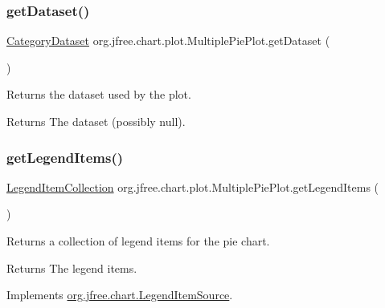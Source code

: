 \subsubsection{\texorpdfstring{get\+Dataset()}{getDataset()}}
{\footnotesize\ttfamily \mbox{\hyperlink{interfaceorg_1_1jfree_1_1data_1_1category_1_1_category_dataset}{Category\+Dataset}} org.\+jfree.\+chart.\+plot.\+Multiple\+Pie\+Plot.\+get\+Dataset (\begin{DoxyParamCaption}{ }\end{DoxyParamCaption})}

Returns the dataset used by the plot.

\begin{DoxyReturn}{Returns}
The dataset (possibly {\ttfamily null}). 
\end{DoxyReturn}
\mbox{\label{classorg_1_1jfree_1_1chart_1_1plot_1_1_multiple_pie_plot_ac0d250e515644283985aec95f5d639f6}} 
\subsubsection{\texorpdfstring{get\+Legend\+Items()}{getLegendItems()}}
{\footnotesize\ttfamily \mbox{\hyperlink{classorg_1_1jfree_1_1chart_1_1_legend_item_collection}{Legend\+Item\+Collection}} org.\+jfree.\+chart.\+plot.\+Multiple\+Pie\+Plot.\+get\+Legend\+Items (\begin{DoxyParamCaption}{ }\end{DoxyParamCaption})}

Returns a collection of legend items for the pie chart.

\begin{DoxyReturn}{Returns}
The legend items. 
\end{DoxyReturn}


Implements \mbox{\hyperlink{interfaceorg_1_1jfree_1_1chart_1_1_legend_item_source_a224409463c4f7a8ef0e2a9df337e6d3b}{org.\+jfree.\+chart.\+Legend\+Item\+Source}}.

\mbox{\label{classorg_1_1jfree_1_1chart_1_1plot_1_1_multiple_pie_plot_a7b11a3d657b29e8c9cf3cc61c20939d6}} 
